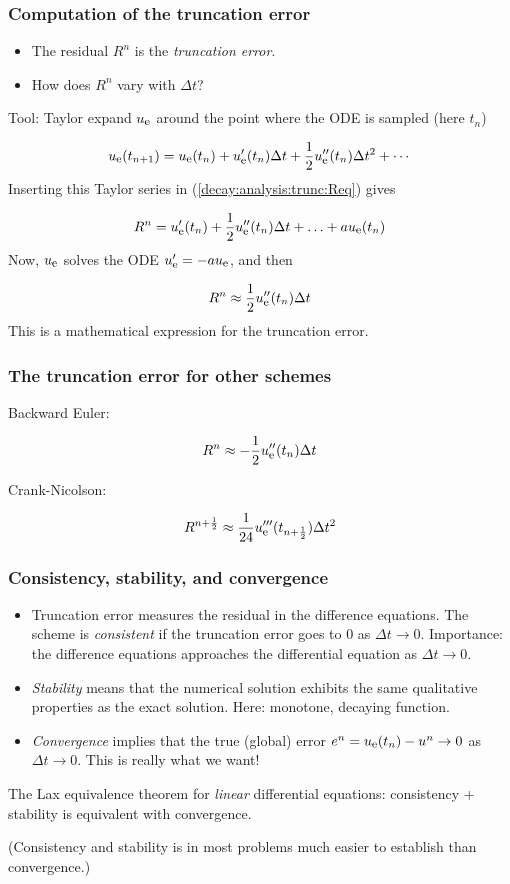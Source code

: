 \documentclass{beamer}
\begin{document}
\begin{frame}
\frametitle{Computation of the truncation error}

\begin{itemize}
 \item The residual $R^n$ is the \emph{truncation error}.

 \item How does $R^n$ vary with $\Delta t$?
\end{itemize}

\noindent
Tool: Taylor expand $\uex$ around the point where the ODE is sampled
(here $t_n$)


\[ \uex(t_{n+1}) = \uex(t_n) + \uex'(t_n)\Delta t + \half\uex''(t_n)
\Delta t^2 + \cdots \]
Inserting this Taylor series in (\ref{decay:analysis:trunc:Req}) gives

\[ R^n = \uex'(t_n) + \half\uex''(t_n)\Delta t + \ldots + a\uex(t_n)\]
Now, $\uex$ solves the ODE $\uex'=-a\uex$, and then

\[ R^n \approx \half\uex''(t_n)\Delta t\]
This is a mathematical expression for the truncation error.
\end{frame}

\begin{frame}
\frametitle{The truncation error for other schemes}

Backward Euler:

\[ R^n \approx -\half\uex''(t_n)\Delta t \]

Crank-Nicolson:

\[ R^{n+\half} \approx \frac{1}{24}\uex'''(t_{n+\half})\Delta t^2\]
\end{frame}

\begin{frame}
\frametitle{Consistency, stability, and convergence}

  

\begin{itemize}
  \item Truncation error measures the residual in the difference equations.
    The scheme is \emph{consistent} if the truncation error goes to 0
    as $\Delta t\rightarrow 0$. Importance: the difference equations
    approaches the differential equation as $\Delta t\rightarrow 0$.

  \item \emph{Stability} means that the numerical solution exhibits the same
    qualitative properties as the exact solution. Here: monotone,
    decaying function.

  \item \emph{Convergence} implies that the true (global) error
    $e^n =\uex(t_n)-u^n\rightarrow 0$ as $\Delta t\rightarrow 0$.
    This is really what we want!
\end{itemize}

\noindent
The Lax equivalence theorem for \emph{linear} differential equations:
consistency + stability is equivalent with convergence.

(Consistency and stability is in most problems
much easier to establish than
convergence.)
\end{frame}
\end{document}
